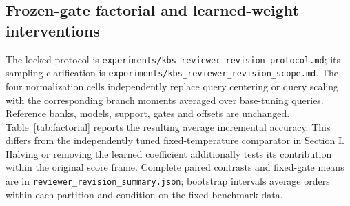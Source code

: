 \documentclass[preprint,review,12pt]{elsarticle}
\begin{document}
\subsection{Frozen-gate factorial and learned-weight interventions}
The locked protocol is \nolinkurl{experiments/kbs_reviewer_revision_protocol.md}; its sampling clarification is \nolinkurl{experiments/kbs_reviewer_revision_scope.md}. The four normalization cells independently replace query centering or query scaling with the corresponding branch moments averaged over base-tuning queries. Reference banks, models, support, gates and offsets are unchanged. Table~\ref{tab:factorial} reports the resulting average incremental accuracy. This differs from the independently tuned fixed-temperature comparator in Section I. Halving or removing the learned coefficient additionally tests its contribution within the original score frame. Complete paired contrasts and fixed-gate means are in \nolinkurl{reviewer_revision_summary.json}; bootstrap intervals average orders within each partition and condition on the fixed benchmark data.

\begin{table}[!htbp]
\centering
\setlength{\belowcaptionskip}{8pt}
\caption{Controlled normalization factorial. Average incremental macro accuracy (\%), mean $\pm$ sample standard deviation over ten partitions after averaging two orders. Only branch centering and scaling change; fusion gates and offsets stay fixed. Query/query is the retained table.}
\label{tab:factorial}
{\small\setlength{\tabcolsep}{5pt}}
\end{table}
\end{document}
